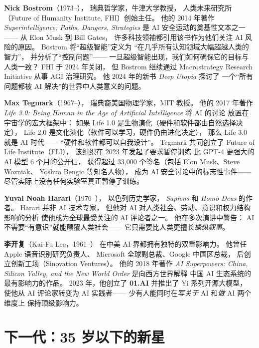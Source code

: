 \textbf{Nick Bostrom}（1973--），
瑞典哲学家，牛津大学教授，
人类未来研究所（Future of Humanity Institute, FHI）创始主任。
他的 2014 年著作 \emph{Superintelligence: Paths, Dangers, Strategies}
是 AI 安全运动的奠基性文本之一——
从 Elon Musk 到 Bill Gates，
许多科技领袖都引用该书作为他们关注 AI 风险的原因。
Bostrom 将``超级智能''定义为
``在几乎所有认知领域大幅超越人类的智力''，
并分析了``控制问题''——
一旦超级智能出现，我们如何确保它的目标与人类一致？
FHI 于 2024 年关闭，
但 Bostrom 继续通过 Macrostrategy Research Initiative 从事 AGI 治理研究。
他 2024 年的新书 \emph{Deep Utopia} 探讨了
一个``所有问题都被 AI 解决''的世界中人类意义的问题。

\textbf{Max Tegmark}（1967--），
瑞典裔美国物理学家，MIT 教授。
他的 2017 年著作 \emph{Life 3.0: Being Human in the Age of
Artificial Intelligence} 将 AI 的讨论
放置在宇宙学的宏大框架中：
如果 Life 1.0 是生物演化（硬件和软件都由自然选择决定），
Life 2.0 是文化演化（软件可以学习，硬件仍由进化决定），
那么 Life 3.0 就是 AI 时代——
``硬件和软件都可以自我设计''。
Tegmark 共同创立了
Future of Life Institute（FLI），
该组织在 2023 年发起了要求暂停训练
比 GPT-4 更强大的 AI 模型 6 个月的公开信，
获得超过 33,000 个签名（包括 Elon Musk、Steve Wozniak、
Yoshua Bengio 等知名人物），
成为 AI 安全讨论中的标志性事件——
尽管实际上没有任何实验室真正暂停了训练。

\textbf{Yuval Noah Harari}（1976--），
以色列历史学家，
\emph{Sapiens} 和 \emph{Homo Deus} 的作者。
Harari 并非 AI 技术专家，
但他对 AI 对人类社会、劳动、意识和权力结构影响的分析
使他成为全球最受关注的 AI 评论者之一。
他在多次演讲中警告：
AI 不需要``有意识''就能颠覆人类社会——
它只需要比人类更擅长\emph{操纵叙事}。

\textbf{李开复}（Kai-Fu Lee，1961--）
在中美 AI 界都拥有独特的双重影响力。
他曾任 Apple 语音识别研究负责人、
Microsoft 全球副总裁、Google 中国区总裁，
后创立创新工场（Sinovation Ventures）。
他的 2018 年著作 \emph{AI Superpowers: China, Silicon Valley,
and the New World Order} 是向西方世界解释
中国 AI 生态系统的最有影响力的作品。
2023 年，他创立了 \textbf{01.AI}
并推出了 Yi 系列开源大模型，
使他从 AI 评论家转变为 AI 实践者——
少有人能同时在\emph{写关于} AI 和\emph{做} AI 两个维度上
保持顶级影响力。

\section{下一代：35 岁以下的新星}
\label{sec:rising}

